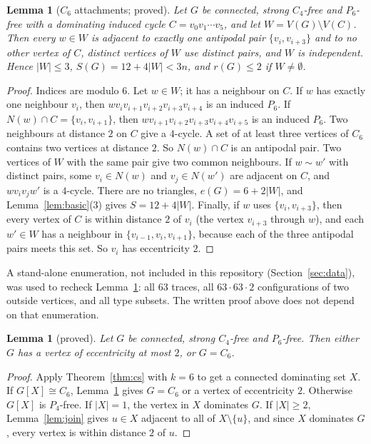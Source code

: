 \documentclass[11pt]{amsart}
\newtheorem{lemma}[theorem]{Lemma}
\theoremstyle{definition}
\theoremstyle{remark}
\begin{document}
\begin{lemma}[$C_6$ attachments; proved]\label{lem:c6}
Let $G$ be connected, strong $C_4$-free and $P_6$-free with a dominating induced cycle $C=v_0v_1\cdots v_5$, and let $W=V(G)\setminus V(C)$. Then every $w\in W$ is adjacent to exactly one antipodal pair $\{v_i,v_{i+3}\}$ and to no other vertex of $C$, distinct vertices of $W$ use distinct pairs, and $W$ is independent. Hence $|W|\le3$, $S(G)=12+4|W|<3n$, and $r(G)\le2$ if $W\ne\emptyset$.
\end{lemma}

\begin{proof}
Indices are modulo $6$. Let $w\in W$; it has a neighbour on $C$. If $w$ has exactly one neighbour $v_i$, then $wv_iv_{i+1}v_{i+2}v_{i+3}v_{i+4}$ is an induced $P_6$. If $N(w)\cap C=\{v_i,v_{i+1}\}$, then $wv_{i+1}v_{i+2}v_{i+3}v_{i+4}v_{i+5}$ is an induced $P_6$. Two neighbours at distance $2$ on $C$ give a $4$-cycle. A set of at least three vertices of $C_6$ contains two vertices at distance $2$. So $N(w)\cap C$ is an antipodal pair. Two vertices of $W$ with the same pair give two common neighbours. If $w\sim w'$ with distinct pairs, some $v_i\in N(w)$ and $v_j\in N(w')$ are adjacent on $C$, and $wv_iv_jw'$ is a $4$-cycle. There are no triangles, $e(G)=6+2|W|$, and Lemma~\ref{lem:basic}(3) gives $S=12+4|W|$. Finally, if $w$ uses $\{v_i,v_{i+3}\}$, then every vertex of $C$ is within distance $2$ of $v_i$ (the vertex $v_{i+3}$ through $w$), and each $w'\in W$ has a neighbour in $\{v_{i-1},v_i,v_{i+1}\}$, because each of the three antipodal pairs meets this set. So $v_i$ has eccentricity $2$.
\end{proof}

A stand-alone enumeration, not included in this repository (Section~\ref{sec:data}), was used to recheck Lemma~\ref{lem:c6}: all $63$ traces, all $63\cdot63\cdot2$ configurations of two outside vertices, and all type subsets. The written proof above does not depend on that enumeration.

\begin{lemma}[proved]\label{lem:ecc2}
Let $G$ be connected, strong $C_4$-free and $P_6$-free. Then either $G$ has a vertex of eccentricity at most $2$, or $G=C_6$.
\end{lemma}

\begin{proof}
Apply Theorem~\ref{thm:cs} with $k=6$ to get a connected dominating set $X$. If $G[X]\cong C_6$, Lemma~\ref{lem:c6} gives $G=C_6$ or a vertex of eccentricity $2$. Otherwise $G[X]$ is $P_4$-free. If $|X|=1$, the vertex in $X$ dominates $G$. If $|X|\ge2$, Lemma~\ref{lem:join} gives $u\in X$ adjacent to all of $X\setminus\{u\}$, and since $X$ dominates $G$, every vertex is within distance $2$ of $u$.
\end{proof}
\end{document}
